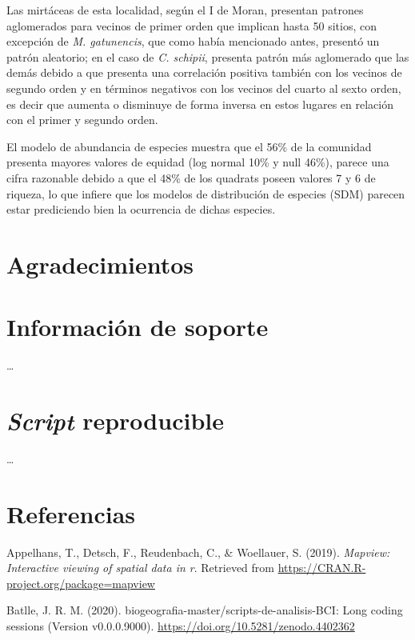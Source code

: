 \documentclass[11pt,]{article}
\begin{document}
Las mirtáceas de esta localidad, según el I de Moran, presentan patrones
aglomerados para vecinos de primer orden que implican hasta 50 sitios,
con excepción de \emph{M. gatunencis}, que como había mencionado antes,
presentó un patrón aleatorio; en el caso de \emph{C. schipii}, presenta
patrón más aglomerado que las demás debido a que presenta una
correlación positiva también con los vecinos de segundo orden y en
términos negativos con los vecinos del cuarto al sexto orden, es decir
que aumenta o disminuye de forma inversa en estos lugares en relación
con el primer y segundo orden.

El modelo de abundancia de especies muestra que el 56\% de la comunidad
presenta mayores valores de equidad (log normal 10\% y null 46\%),
parece una cifra razonable debido a que el 48\% de los quadrats poseen
valores 7 y 6 de riqueza, lo que infiere que los modelos de distribución
de especies (SDM) parecen estar prediciendo bien la ocurrencia de dichas
especies.

\section{Agradecimientos}\label{agradecimientos}

\section{Información de soporte}\label{informaciuxf3n-de-soporte}

\ldots

\section{\texorpdfstring{\emph{Script}
reproducible}{Script reproducible}}\label{script-reproducible}

\ldots

\section*{Referencias}\label{referencias}

\hypertarget{refs}{}
\hypertarget{ref-mapview}{}
Appelhans, T., Detsch, F., Reudenbach, C., \& Woellauer, S. (2019).
\emph{Mapview: Interactive viewing of spatial data in r}. Retrieved from
\url{https://CRAN.R-project.org/package=mapview}

\hypertarget{ref-jose_ramon_martinez_batlle_2020_4402362}{}
Batlle, J. R. M. (2020). biogeografia-master/scripts-de-analisis-BCI:
Long coding sessions (Version v0.0.0.9000).
\url{https://doi.org/10.5281/zenodo.4402362}
\end{document}
